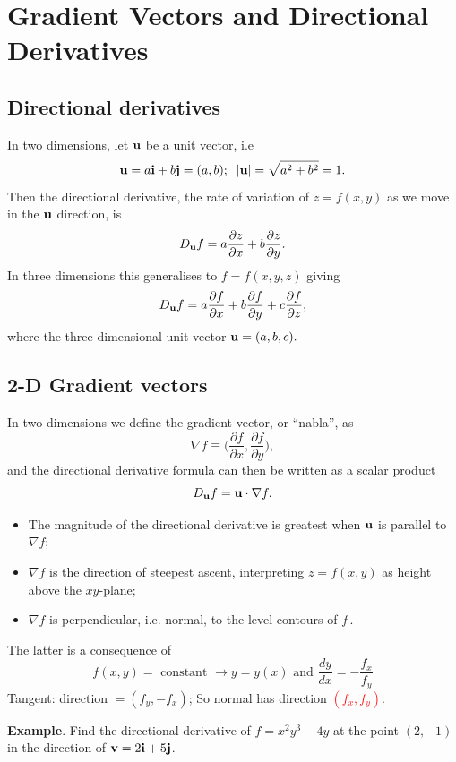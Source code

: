 \documentclass{article}
\begin{document}
\section{Gradient Vectors and Directional Derivatives}
\subsection{Directional derivatives}

In two dimensions, let $\bf u$ be a unit vector, i.e
$$
{\bf u}=a{\bf i} + b {\bf j}=(a,b); \;\; |{\bf u}| = \sqrt{a^2 +b^2} = 1.
$$
Then the directional derivative, the rate of variation of $z =
f(x,y)$ as we move in the $\bf u$ direction, is
$$
D_{\bf u} f = a \frac{\partial z} {\partial x} + b \frac{\partial
z} {\partial y}.
$$
In three dimensions this generalises to $f=f(x,y,z)$ giving
$$ D_{\bf u} f = a \frac{\partial f} {\partial x} +
b \frac{\partial f} {\partial y} + c \frac{\partial f} {\partial
z} ,$$ where the three-dimensional unit vector ${\bf u} =
(a,b,c).$

\subsection{2-D Gradient vectors}

In two dimensions we define the gradient vector, or ``nabla'', as
$$
\nabla f \equiv \Bigr( \frac{\partial f} {\partial x},
\frac{\partial f} {\partial y} \Bigr),
$$
and the directional derivative formula can then be written as a
scalar product
$$
D_{\bf u} f = {\bf u} \cdot \nabla f.
$$
\vspace{-.5cm}

\begin{itemize}
\item
The magnitude of the directional derivative is greatest when
$\bf u$ is parallel to $\nabla f$;
\item
$\nabla f$ is the direction of steepest ascent, interpreting $z=f(x,y)$ as
height above the $xy$-plane;
\item
$\nabla f$ is perpendicular, i.e. normal, to the 
level contours of $f$\,.
\end{itemize}
The latter is a consequence of 
$$
f(x,y) = \mbox{ constant  } \to y = y(x) \mbox{ and } \frac{dy}{dx} = - \frac{f_x}{f_y}
$$
Tangent: direction $= (f_y, -f_x)$; So normal has direction \textcolor{red}{$(f_x, f_y)$}.



\textbf{Example}. Find the directional derivative of
$f=x^2y^3-4y$ at the point $(2,-1)$ in the direction of ${\bf v} =
2{\bf i}+ 5{\bf j}$. \\
\end{document}
